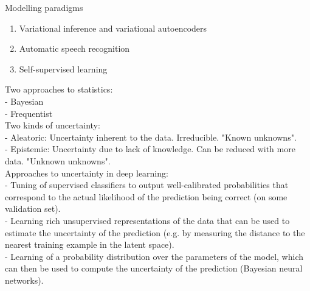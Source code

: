 Modelling paradigms
\begin{enumerate}
    \item Variational inference and variational autoencoders
    \item Automatic speech recognition
    \item Self-supervised learning
\end{enumerate}

\cite{kingma_autoencoding_2014}
\cite{rezende_stochastic_2014}

Two approaches to statistics:\\
- Bayesian\\
- Frequentist\\

Two kinds of uncertainty:\\
- Aleatoric: Uncertainty inherent to the data. Irreducible. "Known unknowns".\\
- Epistemic: Uncertainty due to lack of knowledge. Can be reduced with more data. "Unknown unknowns".\\

Approaches to uncertainty in deep learning:\\
- Tuning of supervised classifiers to output well-calibrated probabilities that correspond to the actual likelihood of the prediction being correct (on some validation set).\\
- Learning rich unsupervised representations of the data that can be used to estimate the uncertainty of the prediction (e.g. by measuring the distance to the nearest training example in the latent space).\\
- Learning of a probability distribution over the parameters of the model, which can then be used to compute the uncertainty of the prediction (Bayesian neural networks).\\


\fi 
